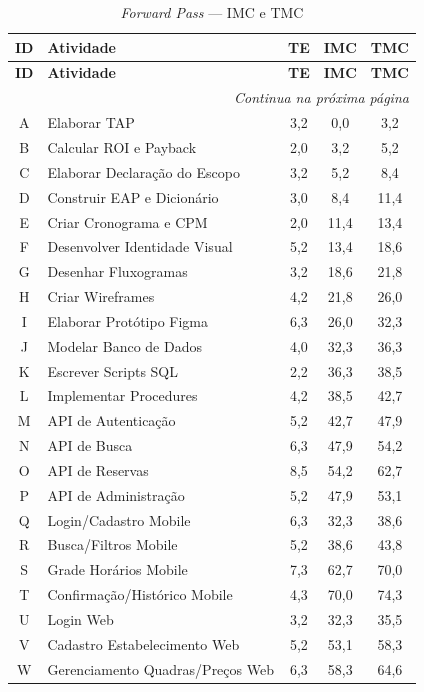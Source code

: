 \documentclass[12pt,a4paper,oneside]{report}
\begin{document}
\begin{longtable}{c p{5.5cm} c c c}
\caption{\textit{Forward Pass} --- IMC e TMC} \\
\toprule
\textbf{ID} & \textbf{Atividade} & \textbf{TE} & \textbf{IMC} & \textbf{TMC} \\
\midrule
\endfirsthead
\toprule
\textbf{ID} & \textbf{Atividade} & \textbf{TE} & \textbf{IMC} & \textbf{TMC} \\
\midrule
\endhead
\midrule
\multicolumn{5}{r}{\textit{Continua na próxima página}} \\
\endfoot
\bottomrule
\endlastfoot
A & Elaborar TAP & 3,2 & 0,0 & 3,2 \\
B & Calcular ROI e Payback & 2,0 & 3,2 & 5,2 \\
C & Elaborar Declaração do Escopo & 3,2 & 5,2 & 8,4 \\
D & Construir EAP e Dicionário & 3,0 & 8,4 & 11,4 \\
E & Criar Cronograma e CPM & 2,0 & 11,4 & 13,4 \\
F & Desenvolver Identidade Visual & 5,2 & 13,4 & 18,6 \\
G & Desenhar Fluxogramas & 3,2 & 18,6 & 21,8 \\
H & Criar Wireframes & 4,2 & 21,8 & 26,0 \\
I & Elaborar Protótipo Figma & 6,3 & 26,0 & 32,3 \\
J & Modelar Banco de Dados & 4,0 & 32,3 & 36,3 \\
K & Escrever Scripts SQL & 2,2 & 36,3 & 38,5 \\
L & Implementar Procedures & 4,2 & 38,5 & 42,7 \\
M & API de Autenticação & 5,2 & 42,7 & 47,9 \\
N & API de Busca & 6,3 & 47,9 & 54,2 \\
O & API de Reservas & 8,5 & 54,2 & 62,7 \\
P & API de Administração & 5,2 & 47,9 & 53,1 \\
Q & Login/Cadastro Mobile & 6,3 & 32,3 & 38,6 \\
R & Busca/Filtros Mobile & 5,2 & 38,6 & 43,8 \\
S & Grade Horários Mobile & 7,3 & 62,7 & 70,0 \\
T & Confirmação/Histórico Mobile & 4,3 & 70,0 & 74,3 \\
U & Login Web & 3,2 & 32,3 & 35,5 \\
V & Cadastro Estabelecimento Web & 5,2 & 53,1 & 58,3 \\
W & Gerenciamento Quadras/Preços Web & 6,3 & 58,3 & 64,6 \\

\end{longtable}
\end{document}
